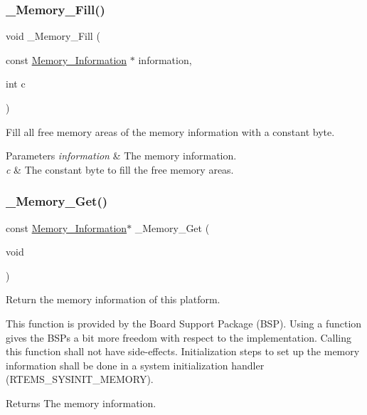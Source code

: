 \subsubsection{\texorpdfstring{\_Memory\_Fill()}{\_Memory\_Fill()}}
{\footnotesize\ttfamily void \+\_\+\+Memory\+\_\+\+Fill (\begin{DoxyParamCaption}\item[{const \mbox{\hyperlink{structMemory__Information}{Memory\+\_\+\+Information}} $\ast$}]{information,  }\item[{int}]{c }\end{DoxyParamCaption})}



Fill all free memory areas of the memory information with a constant byte. 


\begin{DoxyParams}{Parameters}
{\em information} & The memory information. \\
\hline
{\em c} & The constant byte to fill the free memory areas. \\
\hline
\end{DoxyParams}
\mbox{\label{group__RTEMSScoreMemory_gaec9f82588542ae89940517c48f0208f6}} 
\subsubsection{\texorpdfstring{\_Memory\_Get()}{\_Memory\_Get()}}
{\footnotesize\ttfamily const \mbox{\hyperlink{structMemory__Information}{Memory\+\_\+\+Information}}$\ast$ \+\_\+\+Memory\+\_\+\+Get (\begin{DoxyParamCaption}\item[{void}]{ }\end{DoxyParamCaption})}



Return the memory information of this platform. 

This function is provided by the Board Support Package (B\+SP). Using a function gives the B\+S\+Ps a bit more freedom with respect to the implementation. Calling this function shall not have side-\/effects. Initialization steps to set up the memory information shall be done in a system initialization handler (R\+T\+E\+M\+S\+\_\+\+S\+Y\+S\+I\+N\+I\+T\+\_\+\+M\+E\+M\+O\+RY).

\begin{DoxyReturn}{Returns}
The memory information. 
\end{DoxyReturn}
\mbox{\label{group__RTEMSScoreMemory_gaceaec7a5a60fbf7f0d5e5dcd6c0828b2}} 
